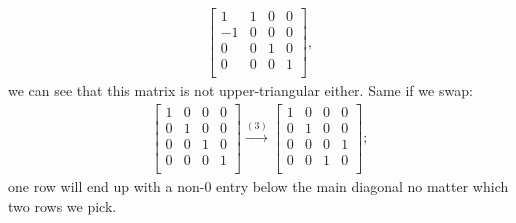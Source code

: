 \documentclass[12pt]{article}
\begin{document}
\begin{enumerate}
\begin{align*}
      \begin{bmatrix}
        1  & 1 & 0 & 0\\
        -1 & 0 & 0 & 0\\
        0  & 0 & 1 & 0\\
        0  & 0 & 0 & 1\\
      \end{bmatrix},
    \end{align*}
    we can see that this matrix is not upper-triangular either.
    Same if we swap:
    \begin{align*}
      \begin{bmatrix}
        1 & 0 & 0 & 0\\
        0 & 1 & 0 & 0\\
        0 & 0 & 1 & 0\\
        0 & 0 & 0 & 1\\
      \end{bmatrix}
      \xrightarrow{(3)}
      \begin{bmatrix}
        1 & 0 & 0 & 0\\
        0 & 1 & 0 & 0\\
        0 & 0 & 0 & 1\\
        0 & 0 & 1 & 0\\
      \end{bmatrix};
    \end{align*}
    one row will end up with a non-$0$ entry below the main
    diagonal no matter which two rows we pick.


\end{enumerate}
\end{document}
